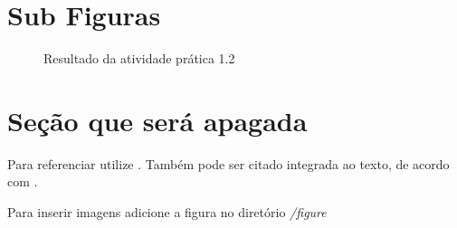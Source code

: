 \section{Sub Figuras}

\begin{figure}[H] %
  \center
  \caption{Resultado da atividade prática 1.2}\label{fig:ap1_cod_vigual1}
\end{figure}

\section{Seção que será apagada}

Para referenciar utilize \cite{ninguem2022curioso}. Também pode ser citado integrada ao texto, de acordo com .

Para inserir imagens adicione a figura no diretório \textit{/figure}

